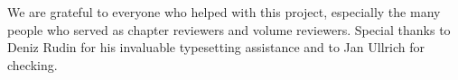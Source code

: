 
We are grateful to everyone who helped with this project, especially the many people who served as chapter reviewers and volume reviewers. Special thanks to Deniz Rudin for his invaluable typesetting assistance and to Jan Ullrich for  checking. 
  

